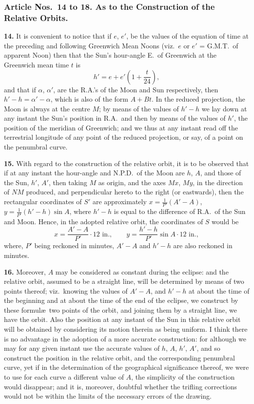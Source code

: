 \documentclass[11pt,a4paper]{article}
\begin{document}
\subsubsection*{Article Nos.\ 14 to 18. As to the Construction of the Relative Orbits.}

\noindent\textbf{14.} It is convenient to notice that if $e$, $e'$, be the values of the equation of time at the preceding and following Greenwich Mean Noons (viz.\ $e$ or $e'$ = G.M.T.\ of apparent Noon) then that the Sun's hour-angle E.\ of Greenwich at the Greenwich mean time $t$ is
\[
h' = e + e'\left(1 + \frac{t}{24}\right),
\]
and that if $\alpha$, $\alpha'$, are the R.A.'s of the Moon and Sun respectively, then $h' - h = \alpha' - \alpha$, which is also of the form $A + Bt$. In the reduced projection, the Moon is always at the centre $M$; by means of the values of $h' - h$ we lay down at any instant the Sun's position in R.A.\ and then by means of the values of $h'$, the position of the meridian of Greenwich; and we thus at any instant read off the terrestrial longitude of any point of the reduced projection, or say, of a point on the penumbral curve.

\noindent\textbf{15.} With regard to the construction of the relative orbit, it is to be observed that if at any instant the hour-angle and N.P.D.\ of the Moon are $h$, $A$, and those of the Sun, $h'$, $A'$, then taking $M$ as origin, and the axes $Mx$, $My$, in the direction of $NM$ produced, and perpendicular hereto to the right (or eastwards), then the rectangular coordinates of $S'$ are approximately $x = \tfrac{1}{P'}(A' - A)$, $y = \tfrac{1}{P'}(h' - h) \sin A$, where $h' - h$ is equal to the difference of R.A.\ of the Sun and Moon. Hence, in the adopted relative orbit, the coordinates of $S$ would be
\[
x = \frac{A' - A}{P'} \cdot 12 \text{ in.}, \qquad y = \frac{h' - h}{P'} \sin A \cdot 12 \text{ in.},
\]
where, $P'$ being reckoned in minutes, $A' - A$ and $h' - h$ are also reckoned in minutes.

\noindent\textbf{16.} Moreover, $A$ may be considered as constant during the eclipse: and the relative orbit, assumed to be a straight line, will be determined by means of two points thereof; viz.\ knowing the values of $A' - A$, and $h' - h$ at about the time of the beginning and at about the time of the end of the eclipse, we construct by these formul\ae\ two points of the orbit, and joining them by a straight line, we have the orbit. Also the position at any instant of the Sun in this relative orbit will be obtained by considering its motion therein as being uniform. I think there is no advantage in the adoption of a more accurate construction: for although we may for any given instant use the accurate values of $h$, $A$, $h'$, $A'$, and so construct the position in the relative orbit, and the corresponding penumbral curve, yet if in the determination of the geographical significance thereof, we were to use for each curve a different value of $A$, the simplicity of the construction would disappear; and it is, moreover, doubtful whether the trifling corrections would not be within the limits of the necessary errors of the drawing.
\end{document}
